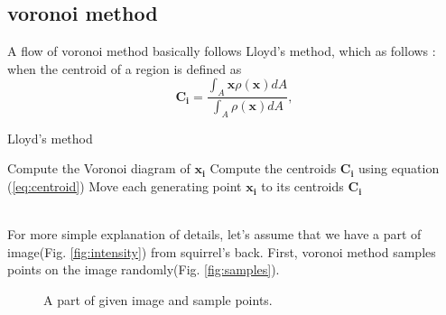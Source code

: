 \documentclass[11pt]{article}
\begin{document}
\subsection{voronoi method}
A flow of voronoi method basically follows Lloyd's method\cite{Okabe:1992:STC:135734}, which as follows : \\
when the centroid of a region is defined as
\begin{equation}\label{eq:centroid}
\mathbf{C_i}=\frac{\int_{A}\mathbf{x}\rho(\mathbf{x})dA}{\int_{A}\rho(\mathbf{x})dA},
\end{equation}
\begin{algorithm}
\caption{Lloyd's method}\label{alg:lloyds}
\begin{algorithmic}[1]
    \State Compute the Voronoi diagram of $\mathbf{x_i}$
    \State Compute the centroids $\mathbf{C_i}$ using equation (\ref{eq:centroid})
    \State Move each generating point $\mathbf{x_i}$ to its centroids $\mathbf{C_i}$
\EndWhile
\end{algorithmic}
\end{algorithm}\\
For more simple explanation of details, let's assume that we have a part of image(Fig. \ref{fig:intensity}) from squirrel's back. %
First, voronoi method samples points on the image randomly(Fig. \ref{fig:samples}). %
\begin{figure}[hbt]
 \centering
 \hspace{-3mm}
  \hspace{-3mm}
    \caption{A part of given image and sample points. \label{fig:sampling}}
\end{figure}\\
\end{document}
